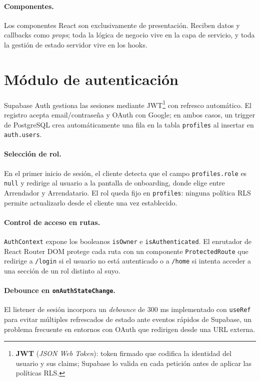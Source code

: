 \paragraph{Componentes.}
Los componentes React son exclusivamente de presentación. Reciben datos y callbacks como \textit{props}; toda la lógica de negocio vive en la capa de servicio, y toda la gestión de estado servidor vive en los hooks.

\section{Módulo de autenticación}
\label{sec:impl_auth}

Supabase Auth gestiona las sesiones mediante JWT\footnote{\textbf{JWT} (\textit{JSON Web Token}): token firmado que codifica la identidad del usuario y sus claims; Supabase lo valida en cada petición antes de aplicar las políticas RLS.} con refresco automático. El registro acepta email/contraseña y OAuth con Google; en ambos casos, un trigger de PostgreSQL crea automáticamente una fila en la tabla \texttt{profiles} al insertar en \texttt{auth.users}.

\paragraph{Selección de rol.}
En el primer inicio de sesión, el cliente detecta que el campo \texttt{profiles.role} es \texttt{null} y redirige al usuario a la pantalla de onboarding, donde elige entre Arrendador y Arrendatario. El rol queda fijo en \texttt{profiles}: ninguna política RLS permite actualizarlo desde el cliente una vez establecido.

\paragraph{Control de acceso en rutas.}
\texttt{AuthContext} expone los booleanos \texttt{isOwner} e \texttt{isAuthenticated}. El enrutador de React Router DOM protege cada ruta con un componente \texttt{ProtectedRoute} que redirige a \texttt{/login} si el usuario no está autenticado o a \texttt{/home} si intenta acceder a una sección de un rol distinto al suyo.

\paragraph{Debounce en \texttt{onAuthStateChange}.}
El listener de sesión incorpora un \textit{debounce} de 300 ms implementado con \texttt{useRef} para evitar múltiples refrescados de estado ante eventos rápidos de Supabase, un problema frecuente en entornos con OAuth que redirigen desde una URL externa.


